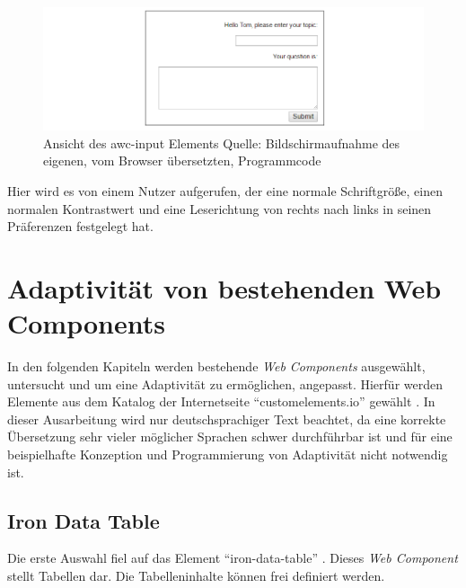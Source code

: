 \documentclass[12pt, paper=a4, bibtotoc, toc=listof, headsepline=true, numbers=endperiod]{scrreprt}
\begin{document}
	\begin{figure}[H]				
		\centering
		\includegraphics[width=\textwidth,height=\textheight,keepaspectratio]{awcInput.png}
		\caption[Ansicht awc-input]{Ansicht des awc-input Elements Quelle: Bildschirmaufnahme des eigenen, vom Browser übersetzten, Programmcode}
		\label{img:awcInput}
	\end{figure}\noindent
	Hier wird es von einem Nutzer aufgerufen, der eine normale Schriftgröße, einen normalen Kontrastwert und eine Leserichtung von rechts nach links in seinen Präferenzen festgelegt hat.
\chapter{Adaptivität von bestehenden Web Components}
\label{sec:adaVonBesWebCom}
	In den folgenden Kapiteln werden bestehende \emph{Web Components} ausgewählt, untersucht und um eine Adaptivität zu ermöglichen, angepasst. Hierfür werden Elemente aus dem Katalog der Internetseite \enquote{customelements.io} gewählt \cite{cusEleIo}. In dieser Ausarbeitung wird nur deutschsprachiger Text beachtet, da eine korrekte Übersetzung sehr vieler möglicher Sprachen schwer durchführbar ist und für eine beispielhafte Konzeption und Programmierung von Adaptivität nicht notwendig ist.
	\section{Iron Data Table}
	Die erste Auswahl fiel auf das Element \enquote{iron-data-table} \cite{saulis}. Dieses \emph{Web Component} stellt Tabellen dar. Die Tabelleninhalte können frei definiert werden.
\end{document}
